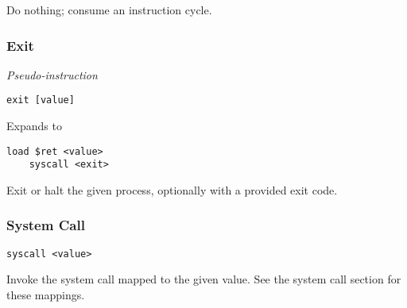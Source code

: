 Do nothing; consume an instruction cycle.

\subsubsection{Exit}

\textit{Pseudo-instruction}

\begin{lstlisting}[style=assembly]
    exit [value]
\end{lstlisting}

Expands to

\begin{lstlisting}[style=assembly]
    load $ret <value>
    syscall <exit>
\end{lstlisting}

Exit or halt the given process, optionally with a provided exit code.

\subsubsection{System Call}

\begin{lstlisting}[style=assembly]
    syscall <value>
\end{lstlisting}

Invoke the system call mapped to the given value.
See the system call section for these mappings.

